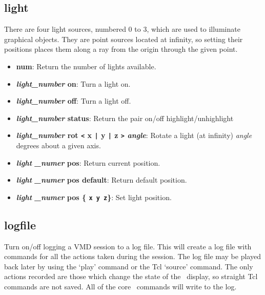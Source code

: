 \subsection{light}
There are four light sources, numbered 0 to 3, which are used to
illuminate graphical objects.  They are point sources located at
infinity, so setting their positions places them along a ray from the
origin through the given point. 

  \begin{itemize}
    \item {\bf  num}: Return the number of lights available.
    \item {\bf  {\it light\_number} on}: Turn a light on.
    \item {\bf  {\it light\_number} off}: Turn a light off.
    \item {\bf  {\it light\_number} status}: Return the pair on/off highlight/unhighlight
    \item {\bf  {\it light\_number} rot {\tt <}  x {\tt |} y {\tt |} z {\tt >}  {\it angle}}: Rotate a light (at infinity) {\it angle} degrees about a given axis.
    \item {\bf  {\it light \_numer} pos}: Return current position.
    \item {\bf  {\it light \_numer} pos default}: Return default position.
    \item {\bf  {\it light \_numer} pos \{ {\tt x y z}\}}: Set light position.
    
  \end{itemize}


  \subsection{logfile}\label{ug:text:log} 
  Turn on/off logging a VMD session to a log file.  This will create a
  log file with commands for all the actions taken during the session.
  The log file may be played back later by using the `play' command or
  the Tcl `source' command.  The only actions recorded are those which
  change the state of the \VMD\ display, so straight Tcl commands are
  not saved.  All of the core \VMD\ commands will write to the log.


